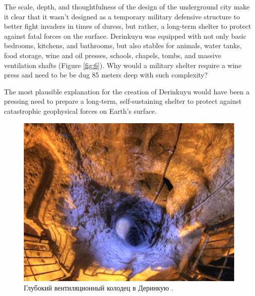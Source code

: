 \documentclass[10pt,twocolumn,letterpaper]{article}
\begin{document}
The scale, depth, and thoughtfulness of the design of the underground city make it clear that it wasn't designed as a temporary military defensive structure to better fight invaders in times of duress, but rather, a long-term shelter to protect against fatal forces on the surface. Derinkuyu was equipped with not only basic bedrooms, kitchens, and bathrooms, but also stables for animals, water tanks, food storage, wine and oil presses, schools, chapels, tombs, and massive ventilation shafts (Figure \ref{fig:6}). Why would a military shelter require a wine press and need to be be dug 85 meters deep with such complexity?

The most plausible explanation for the creation of Derinkuyu would have been a pressing need to prepare a long-term, self-sustaining shelter to protect against catastrophic geophysical forces on Earth's surface.

\begin{figure}[t]
\begin{center}
   \includegraphics[width=1\linewidth]{derinkuyu-air.jpg}
\end{center}
   \caption{Глубокий вентиляционный колодец в Деринкую \cite{53}.}
\label{fig:6}
\label{fig:onecol}
\end{figure}


\end{document}
